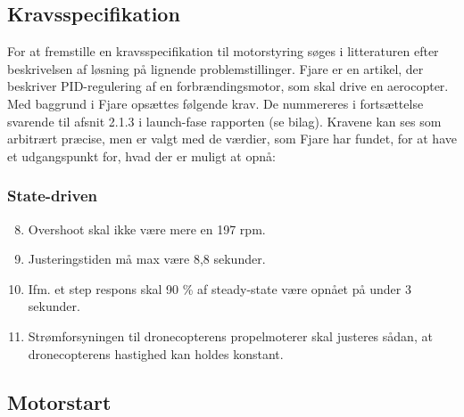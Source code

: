 

\subsection{Kravsspecifikation}
\label{sec:kravsspecifikation}
For at fremstille en kravsspecifikation til motorstyring søges i litteraturen efter beskrivelsen af løsning på lignende problemstillinger. Fjare\autocite{pid1} er en artikel, der beskriver PID-regulering af en forbrændingsmotor, som skal drive en aerocopter. Med baggrund i Fjare\autocite{pid1} opsættes følgende krav. De nummereres i fortsættelse svarende til afsnit 2.1.3  i launch-fase rapporten (se bilag). Kravene kan ses som arbitrært præcise, men er valgt med de værdier, som Fjare\autocite{pid1} har fundet, for at have et udgangspunkt for, hvad der er muligt at opnå:

\subsubsection{State-driven}
\label{sec:state-driven-1}

\begin{enumerate}[label=2.1.3.\arabic*]
  \setcounter{enumi}{7}
\item Overshoot skal ikke være mere en 197 rpm.
\item Justeringstiden må max være 8,8 sekunder.
\item Ifm. et step respons skal 90 \% af steady-state være opnået på under 3 sekunder.
\item Strømforsyningen til dronecopterens propelmoterer skal justeres sådan, at dronecopterens hastighed kan holdes konstant.%
\end{enumerate}

\subsection{Motorstart}
\label{sec:esc}

